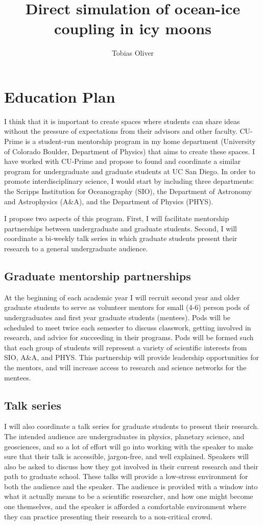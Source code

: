\documentclass[12pt]{article}
\title{Direct simulation of ocean-ice coupling in icy moons}
\author{Tobias Oliver}
\date{}
\begin{document}
\newcommand{\citep}[1]{\cite{#1}}
\section*{Education Plan}
I think that it is important to create spaces where students can share ideas without the pressure of expectations from their advisors and other faculty.
CU-Prime\citep{cup} is a student-run mentorship program in my home department (University of Colorado Boulder, Department of Physics) that aims to create these spaces. 
I have worked with CU-Prime and propose to found and coordinate a similar program for undergraduate and graduate students at UC San Diego. In order to promote interdisciplinary science, I would start by including three departments: the Scripps Institution for Oceanography (SIO), the Department of Astronomy and Astrophysics (A\&A), and the Department of Physics (PHYS). 

I propose two aspects of this program. First, I will facilitate mentorship partnerships between undergraduate and graduate students. Second, I will coordinate a bi-weekly talk series in which graduate students present their research to a general undergraduate audience. 

\subsection*{Graduate mentorship partnerships}
At the beginning of each academic year I will recruit second year and older graduate students to serve as volunteer mentors for small (4-6) person pods of undergraduates and first year graduate students (mentees). Pods will be scheduled to meet twice each semester to discuss classwork, getting involved in research, and advice for succeeding in their programs. 
Pods will be formed such that each group of students will represent a variety of scientific interests from SIO, A\&A, and PHYS. 
This partnership will provide leadership opportunities for the mentors, and will increase access to research and science networks for the mentees.
\subsection*{Talk series}
I will also coordinate a talk series for graduate students to present their research. The intended audience are undergraduates in physics, planetary science, and geosciences, and so a lot of effort will go into working with the speaker to make sure that their talk is accessible, jargon-free, and well explained. Speakers will also be asked to discuss how they got involved in their current research and their path to graduate school. These talks will provide a low-stress environment for both the audience and the speaker.
The audience is provided with a window into what it actually means to be a scientific researcher, and how one might become one themselves, and the speaker is afforded a comfortable environment where they can practice presenting their research to a non-critical crowd.
\end{document}
